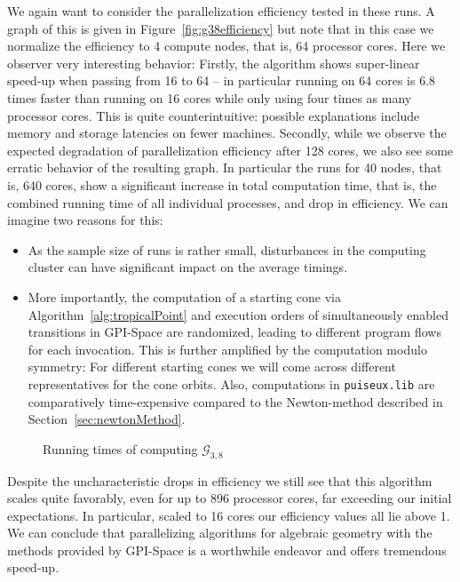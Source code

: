 \documentclass[
  paper=a4,
  titlepage,
  bibliography=totoc,
  pagesize=pdftex
]{scrartcl}
\numberwithin{figure}{section}
\numberwithin{equation}{section}
\numberwithin{table}{section}
\theoremstyle{definition}
\numberwithin{definition}{section}
\begin{document}
We again want to consider the parallelization efficiency tested in these runs. A graph of
this is given in Figure~\ref{fig:g38efficiency} but note that in this case we normalize
the efficiency to 4 compute nodes, that is, 64 processor cores. Here we observer very
interesting behavior: Firstly, the algorithm shows super-linear speed-up when passing from
16 to 64 -- in particular running on 64 cores is 6.8 times faster than running on 16 cores
while only using four times as many processor cores. This is quite counterintuitive:
possible explanations include memory and storage latencies on fewer machines. Secondly, while we observe the expected degradation of parallelization efficiency
after 128 cores, we also see some erratic behavior of the resulting graph. In particular
the runs for 40 nodes, that is, 640 cores, show a significant increase in total
computation time, that is, the combined running time of all individual processes, and drop
in efficiency. We can imagine two reasons for this:
\begin{itemize}
  \item As the sample size of runs is rather small, disturbances in the computing cluster
    can have significant impact on the average timings.
  \item More importantly, the computation of a starting cone via
    Algorithm~\ref{alg:tropicalPoint} and execution orders of simultaneously enabled
    transitions in GPI-Space are randomized, leading to different program flows for each
    invocation. This is further amplified by the computation modulo symmetry: For
    different starting cones we will come across different representatives for the cone
    orbits. Also, computations in \texttt{puiseux.lib} are comparatively time-expensive
    compared to the Newton-method described in Section~\ref{sec:newtonMethod}.
\end{itemize}

\begin{figure}[htbp]
  \begin{center}
    
  \end{center}
  \caption{Running times of computing $\mathcal{G}_{3,8}$}
  \label{fig:g38scaling}
\end{figure}

Despite the uncharacteristic drops in efficiency we still see that this algorithm scales
quite favorably, even for up to 896 processor cores, far exceeding our initial
expectations. In particular, scaled to 16 cores our efficiency values all lie above 1.
We can conclude that parallelizing algorithms for algebraic geometry with the methods
provided by GPI-Space is a worthwhile endeavor and offers tremendous speed-up.
\end{document}
